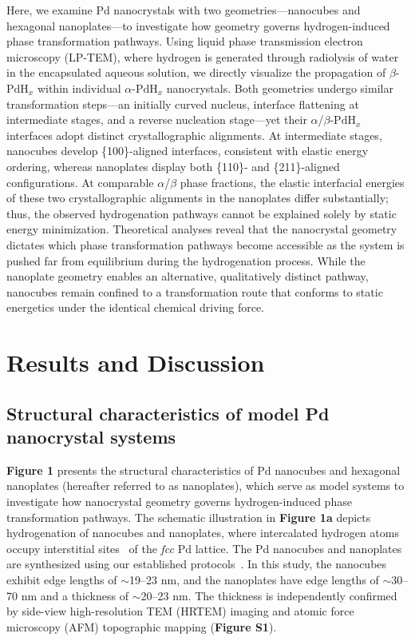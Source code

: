 \documentclass[reprint,amsmath,amssymb,aip,nofootinbib, citeautoscript,]{revtex4-2}
\begin{document}
Here, we examine Pd nanocrystals with two geometries—nanocubes and hexagonal nanoplates—to investigate how geometry governs hydrogen-induced phase transformation pathways. Using liquid phase transmission electron microscopy (LP-TEM), where hydrogen is generated through radiolysis of water in the encapsulated aqueous solution, we directly visualize the propagation of $\beta$-$\mathrm{PdH}_x$ within individual $\alpha$-$\mathrm{PdH}_x$ nanocrystals. Both geometries undergo similar transformation steps—an initially curved nucleus, interface flattening at intermediate stages, and a reverse nucleation stage—yet their $\alpha$/$\beta$-$\mathrm{PdH}_x$ interfaces adopt distinct crystallographic alignments. At intermediate stages, nanocubes develop \{100\}-aligned interfaces, consistent with elastic energy ordering, whereas nanoplates display both \{110\}- and \{211\}-aligned configurations. At comparable $\alpha$/$\beta$ phase fractions, the elastic interfacial energies of these two crystallographic alignments in the nanoplates differ substantially; thus, the observed hydrogenation pathways cannot be explained solely by static energy minimization. Theoretical analyses reveal that the nanocrystal geometry dictates which phase transformation pathways become accessible as the system is pushed far from equilibrium during the hydrogenation process. While the nanoplate geometry enables an alternative, qualitatively distinct pathway, nanocubes remain confined to a transformation route that conforms to static energetics under the identical chemical driving force.


\section*{\label{sec:results}Results and Discussion}

\subsection*{\label{sec:struct}Structural characteristics of model Pd nanocrystal systems}


\textbf{Figure 1} presents the structural characteristics of Pd nanocubes and hexagonal nanoplates (hereafter referred to as nanoplates), which serve as model systems to investigate how nanocrystal geometry governs hydrogen-induced phase transformation pathways. The schematic illustration in \textbf{Figure 1a} depicts hydrogenation of nanocubes and nanoplates, where intercalated hydrogen atoms occupy interstitial sites~\cite{dekura_electronic_2018,schneemann_nanostructured_2018} of the \textit{fcc} Pd lattice. The Pd nanocubes and nanoplates are synthesized using our established protocols~\cite{xiong_polyvinyl_2006,jin_synthesis_2011}. In this study, the nanocubes exhibit edge lengths of $\sim$19–23 nm, and the nanoplates have edge lengths of $\sim$30–70 nm and a thickness of $\sim$20–23 nm. The thickness is independently confirmed by side-view high-resolution TEM (HRTEM) imaging and atomic force microscopy (AFM) topographic mapping (\textbf{Figure S1}).
\end{document}
